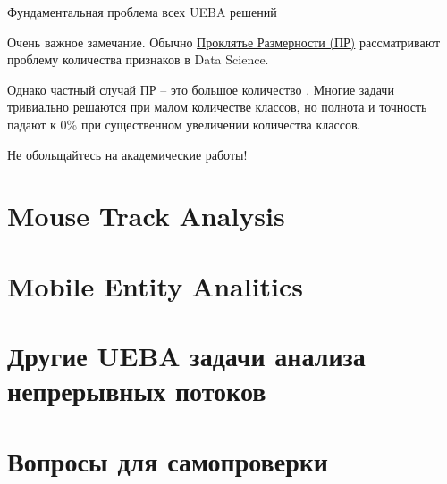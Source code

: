 \begin{frame}{Фундаментальная проблема всех UEBA решений}
	\begin{block}{Очень важное замечание.}
		Обычно \href{https\%3A\%2F\%2Fru.wikipedia.org\%2Fwiki\%2F\%D0\%9F\%D1\%80\%D0\%BE\%D0\%BA\%D0\%BB\%D1\%8F\%D1\%82\%D0\%B8\%D0\%B5_\%D1\%80\%D0\%B0\%D0\%B7\%D0\%BC\%D0\%B5\%D1\%80\%D0\%BD\%D0\%BE\%D1\%81\%D1\%82\%D0\%B8}{Проклятье Размерности (ПР)}
		рассматривают проблему количества признаков в Data Science.
		
		Однако частный случай ПР -- это большое количество .
		Многие задачи тривиально решаются при малом количестве классов, 
		но полнота и точность падают к 0\% при существенном увеличении количества классов.
		
		Не обольщайтесь на академические работы!
	\end{block}


\end{frame}


\section{Mouse Track Analysis}\label{section:mca}


\section{Mobile Entity Analitics}\label{section:mea}

\section{Другие UEBA задачи анализа непрерывных потоков}\label{section:ueba_other}

\section{Вопросы для самопроверки}

